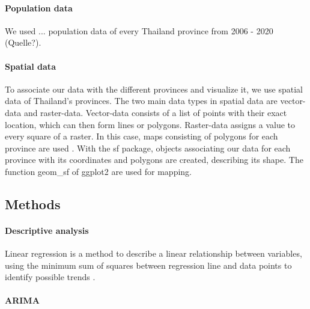 	\paragraph{Population data}
	We used ... population data of every Thailand province from 2006 - 2020 (Quelle?).
	
	\paragraph{Spatial data}
	To associate our data with the different provinces and visualize it, we use spatial data of Thailand’s provinces. The two main data types in spatial data are vector-data and raster-data. Vector-data consists of a list of points with their exact location, which can then form lines or polygons. Raster-data assigns a value to every square of a raster. In this case, maps consisting of polygons for each province are used \citep{sds}. With the sf package, objects associating our data for each province with its coordinates and polygons are created, describing its shape. The function geom\_sf of ggplot2 are used for mapping. 
	
	\subsection{Methods}
	
	\paragraph{Descriptive analysis}
	Linear regression is a method to describe a linear relationship between variables, using the minimum sum of squares between regression line and data points to identify possible trends \citep{Schneider2010}. 


	\paragraph{ARIMA}
	
